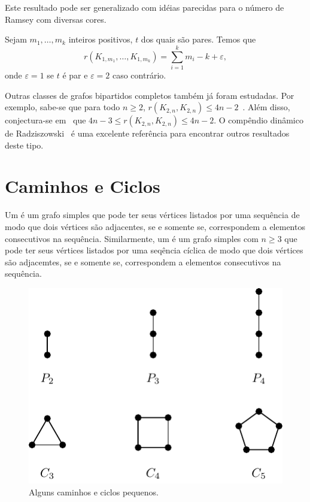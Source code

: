 Este resultado pode ser generalizado com idéias parecidas para o número de Ramsey com diversas cores.

\begin{theorem}
Sejam $m_1, \dots, m_k$ inteiros positivos, $t$ dos quais são pares. Temos que
\[r(K_{1,m_1}, \dotsc,  K_{1,m_k}) = \sum_{i=1}^{k} m_i  - k + \varepsilon,\]
onde $\varepsilon = 1$ se $t$ é par e $\varepsilon = 2$ caso contrário.
\end{theorem}

Outras classes de grafos bipartidos completos também já foram estudadas. Por exemplo, sabe-se que para todo $n\geq 2$,  $r(K_{2,n}, K_{2,n}) \leq 4n -2$~\cite{exoo}. Além disso, conjectura-se em~\cite{lortz2002ramsey} que $4n - 3 \leq r(K_{2,n}, K_{2,n}) \leq 4n -2$.
O compêndio dinâmico de Radziszowski~\cite{small_ramsey} é uma excelente referência para encontrar outros resultados deste tipo.


\section{Caminhos e Ciclos}

Um  é um grafo simples que pode ter seus vértices listados por uma sequência de modo que dois vértices são adjacentes, se e somente se, correspondem a elementos consecutivos na sequência. Similarmente, um  é um grafo simples com $n \geq 3$ que pode ter seus vértices listados por uma seqência cíclica de modo que dois vértices são adjacemtes, se e somente se, correspondem a elementos consecutivos na sequência.

\begin{figure}[ht!]
\centering
\includegraphics{figures/3_graph_2_cyclepath}
\caption{Alguns caminhos e ciclos pequenos.}
\label{graph:fig:cyclepath}
\end{figure}

